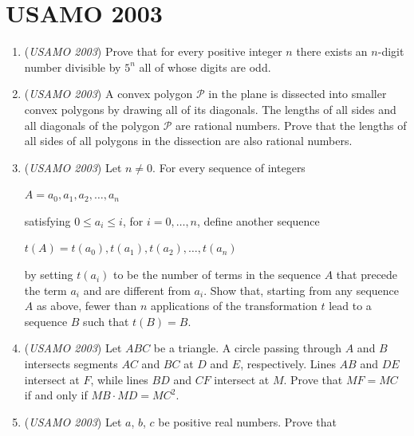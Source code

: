 \section{USAMO 2003}
        \begin{enumerate}
        	\item (\textit{USAMO 2003}) Prove that for every positive integer $n$ there exists an $n$-digit number divisible by $5^n$ all of whose digits are odd.


 

	\item (\textit{USAMO 2003}) A convex polygon $\mathcal{P}$ in the plane is dissected into smaller convex polygons by drawing all of its diagonals. The lengths of all sides and all diagonals of the polygon $\mathcal{P}$ are rational numbers. Prove that the lengths of all sides of all polygons in the dissection are also rational numbers.


 

	\item (\textit{USAMO 2003}) Let $n \neq 0$. For every sequence of integers


 
$A = a_0,a_1,a_2,\dots, a_n$


 


 satisfying $0 \le a_i \le i$, for $i=0,\dots,n$, define another sequence


 
$t(A)= t(a_0), t(a_1), t(a_2), \dots, t(a_n)$


 


 by setting $t(a_i)$ to be the number of terms in the sequence $A$ that precede the term $a_i$ and are different from $a_i$. Show that, starting from any sequence $A$ as above, fewer than $n$ applications of the transformation $t$ lead to a sequence $B$ such that $t(B) = B$.


 

	\item (\textit{USAMO 2003}) Let $ABC$ be a triangle. A circle passing through $A$ and $B$ intersects segments $AC$ and $BC$ at $D$ and $E$, respectively. Lines $AB$ and $DE$ intersect at $F$, while lines $BD$ and $CF$ intersect at $M$. Prove that $MF = MC$ if and only if $MB\cdot MD = MC^2$.


 

	\item (\textit{USAMO 2003}) Let $a$, $b$, $c$ be positive real numbers. Prove that



\end{enumerate}
